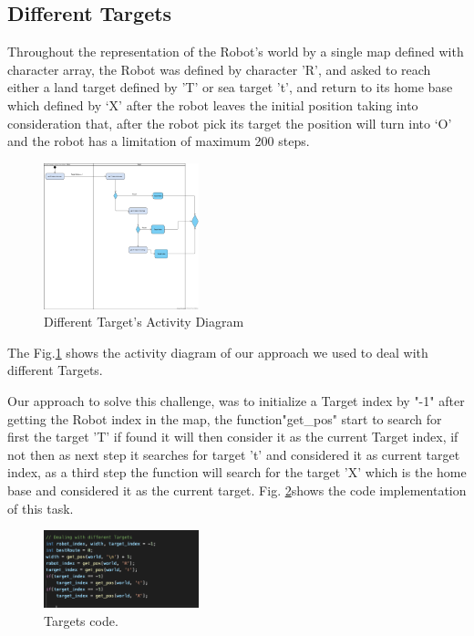 \documentclass[10pt,journal,compsoc]{IEEEtran}
\begin{document}
\subsection{Different Targets}

Throughout the  representation of  the Robot's world by a single map defined with character  array, the Robot was defined by character 'R', and asked to  reach either a land target defined by  'T' or sea target 't', and return to its home base which defined by ‘X’ after the robot leaves the initial position taking into consideration that, after the robot pick its  target the position will  turn into ‘O’ and the robot has a limitation of  maximum 200 steps. 


\begin{figure}[!h]
	
	\centering
	\includegraphics[width=0.4\textwidth]{targets.png}
	\caption{\label{targetAct}Different Target's Activity Diagram }
	
\end{figure}

The Fig.\ref{targetAct}   shows the activity diagram of our  approach we used to deal with different Targets.


Our approach to solve this challenge, was to initialize a Target index by "-1" after getting the Robot index in the map, the function"get\_pos" start to search for first the target 'T' if found it will then consider it as the current Target index, if  not then as next step it searches for target 't' and considered it as current target index, as a third step the function will search for the target 'X' which is the home base and considered it as the current target. Fig. \ref{targetCode}shows  the code implementation of this task. 

\begin{figure}[!h]
	
	\centering
	\includegraphics[width=0.4\textwidth]{targetsCode.png}
	\caption{\label{targetCode}Targets code.}
	
\end{figure}
\end{document}
